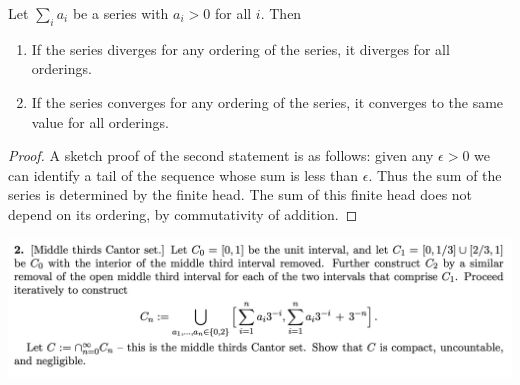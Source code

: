 \begin{enumerate}[label=(1.\arabic*)]
  \begin{lemma*}
    Let $\sum_i a_i$ be a series with $a_i > 0$ for all $i$. Then
    \begin{enumerate}
    \item If the series diverges for any ordering of the series, it diverges for all orderings.
    \item If the series converges for any ordering of the series, it converges to the same value for all
      orderings.
    \end{enumerate}
  \end{lemma*}
  \begin{proof}
    A sketch proof of the second statement is as follows: given any $\epsilon > 0$ we can identify a tail of
    the sequence whose sum is less than $\epsilon$. Thus the sum of the series is determined by the finite
    head. The sum of this finite head does not depend on its ordering, by commutativity of addition.
  \end{proof}
\end{enumerate}


\newpage
\begin{mdframed}
  \includegraphics[width=400pt]{img/analysis--berkeley-202a-8d78.png}
\end{mdframed}

